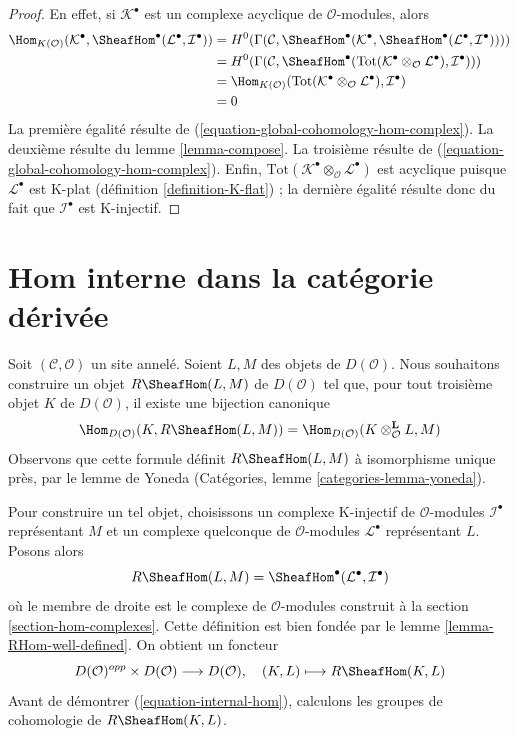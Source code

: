 \begin{proof}
En effet, si $\mathcal{K}^\bullet$ est un complexe acyclique de
$\mathcal{O}$-modules, alors
\begin{align*}
\Hom_{K(\mathcal{O})}(\mathcal{K}^\bullet,
\SheafHom^\bullet(\mathcal{L}^\bullet, \mathcal{I}^\bullet))
& =
H^0(\Gamma(\mathcal{C},
\SheafHom^\bullet(\mathcal{K}^\bullet,
\SheafHom^\bullet(\mathcal{L}^\bullet, \mathcal{I}^\bullet)))) \\
& =
H^0(\Gamma(\mathcal{C}, \SheafHom^\bullet(\text{Tot}(
\mathcal{K}^\bullet \otimes_\mathcal{O} \mathcal{L}^\bullet),
\mathcal{I}^\bullet))) \\
& =
\Hom_{K(\mathcal{O})}(
\text{Tot}(\mathcal{K}^\bullet \otimes_\mathcal{O} \mathcal{L}^\bullet),
\mathcal{I}^\bullet) \\
& =
0
\end{align*}
La première égalité résulte de (\ref{equation-global-cohomology-hom-complex}).
La deuxième résulte du lemme \ref{lemma-compose}.
La troisième résulte de (\ref{equation-global-cohomology-hom-complex}).
Enfin,
$\text{Tot}(\mathcal{K}^\bullet \otimes_\mathcal{O} \mathcal{L}^\bullet)$
est acyclique puisque $\mathcal{L}^\bullet$ est K-plat
(définition \ref{definition-K-flat}) ; la dernière égalité résulte donc du fait que
$\mathcal{I}^\bullet$ est K-injectif.
\end{proof}








\section{Hom interne dans la catégorie dérivée}
\label{section-internal-hom}

\noindent
Soit $(\mathcal{C}, \mathcal{O})$ un site annelé. Soient $L, M$ des objets
de $D(\mathcal{O})$. Nous souhaitons construire un objet
$R\SheafHom(L, M)$ de $D(\mathcal{O})$ tel que, pour tout troisième
objet $K$ de $D(\mathcal{O})$, il existe une bijection canonique
\begin{equation}
\label{equation-internal-hom}
\Hom_{D(\mathcal{O})}(K, R\SheafHom(L, M))
=
\Hom_{D(\mathcal{O})}(K \otimes_\mathcal{O}^\mathbf{L} L, M)
\end{equation}
Observons que cette formule définit $R\SheafHom(L, M)$ à isomorphisme
unique près, par le lemme de Yoneda
(Catégories, lemme \ref{categories-lemma-yoneda}).

\medskip\noindent
Pour construire un tel objet, choisissons un complexe K-injectif de
$\mathcal{O}$-modules $\mathcal{I}^\bullet$ représentant $M$ et un
complexe quelconque de $\mathcal{O}$-modules $\mathcal{L}^\bullet$ représentant $L$.
Posons alors
$$
R\SheafHom(L, M) = \SheafHom^\bullet(\mathcal{L}^\bullet, \mathcal{I}^\bullet)
$$
où le membre de droite est le complexe de $\mathcal{O}$-modules
construit à la section \ref{section-hom-complexes}.
Cette définition est bien fondée par le lemme \ref{lemma-RHom-well-defined}.
On obtient un foncteur
$$
D(\mathcal{O})^{opp} \times D(\mathcal{O}) \longrightarrow D(\mathcal{O}),
\quad
(K, L) \longmapsto R\SheafHom(K, L)
$$
Avant de démontrer (\ref{equation-internal-hom}),
calculons les groupes de cohomologie de $R\SheafHom(K, L)$.

